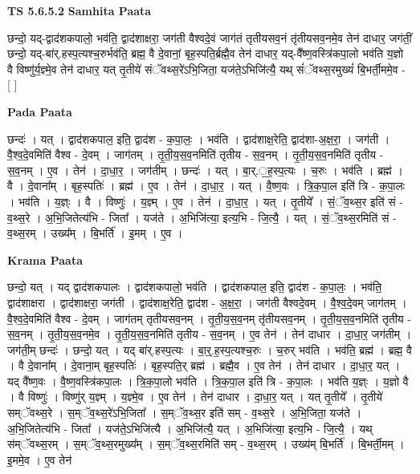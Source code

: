 \documentclass[17pt]{extarticle}
\begin{document}
\textbf{TS 5.6.5.2 } \newline
\textbf{Samhita Paata} \newline

छन्दो॒ यद्-द्वाद॑शकपालो॒ भव॑ति॒ द्वाद॑शाक्षरा॒ जग॑ती वैश्वदे॒वं जाग॑तं तृतीयसव॒नं तृ॑तीयसव॒नमे॒व तेन॑ दाधार॒ जग॑तीं॒ छन्दो॒ यद्-बा॑र्.हस्प॒त्यश्च॒रुर्भव॑ति॒ ब्रह्म॒ वै दे॒वानां॒ बृह॒स्पति॒र्ब्रह्मै॒व तेन॑ दाधार॒ यद्-वै᳚ष्ण॒वस्त्रि॑कपा॒लो भव॑ति य॒ज्ञो वै विष्णु॑र्य॒ज्ञ्मे॒व तेन॑ दाधार॒ यत् तृ॒तीये॑ संॅवथ्स॒रे॑ऽभि॒जिता॒ यज॑ते॒ऽभिजि॑त्यै॒ यथ् सं॑ॅवथ्स॒रमुख्यं॑ बि॒भर्ती॒ममे॒व - [  ] \newline

\textbf{Pada Paata} \newline

छन्दः॑ । यत् । द्वाद॑शकपाल॒ इति॒ द्वाद॑श - क॒पा॒लः॒ । भव॑ति । द्वाद॑शाक्ष॒रेति॒ द्वाद॑शा-अ॒क्ष॒रा॒ । जग॑ती । वै॒श्व॒दे॒वमिति॑ वैश्व - दे॒वम् । जाग॑तम् । तृ॒ती॒य॒स॒व॒नमिति॑ तृतीय - स॒व॒नम् । तृ॒ती॒य॒स॒व॒नमिति॑ तृतीय - स॒व॒नम् । ए॒व । तेन॑ । दा॒धा॒र॒ । जग॑तीम् । छन्दः॑ । यत् । बा॒र्.॒ह॒स्प॒त्यः । च॒रुः । भव॑ति । ब्रह्म॑ । वै । दे॒वाना᳚म् । बृह॒स्पतिः॑ । ब्रह्म॑ । ए॒व । तेन॑ । दा॒धा॒र॒ । यत् । वै॒ष्ण॒वः । त्रि॒क॒पा॒ल इति॑ त्रि - क॒पा॒लः । भव॑ति । य॒ज्ञ्ः । वै । विष्णुः॑ । य॒ज्ञ्म् । ए॒व । तेन॑ । दा॒धा॒र॒ । यत् । तृ॒तीये᳚ । सं॒ॅव॒थ्स॒र इति॑ सं - व॒थ्स॒रे । अ॒भि॒जितेत्य॑भि - जिता᳚ । यज॑ते । अ॒भिजि॑त्या॒ इत्य॒भि - जि॒त्यै॒ । यत् । सं॒ॅव॒थ्स॒रमिति॑ सं - व॒थ्स॒रम् । उख्य᳚म् । बि॒भर्ति॑ । इ॒मम् । ए॒व ।  \newline


\textbf{Krama Paata} \newline

छन्दो॒ यत् । यद् द्वाद॑शकपालः । द्वाद॑शकपालो॒ भव॑ति । द्वाद॑शकपाल॒ इति॒ द्वाद॑श - क॒पा॒लः॒ । भव॑ति॒ द्वाद॑शाक्षरा । द्वाद॑शाक्षरा॒ जग॑ती । द्वाद॑शाक्ष॒रेति॒ द्वाद॑श - अ॒क्ष॒रा॒ । जग॑ती वैश्वदे॒वम् । वै॒श्व॒दे॒वम् जाग॑तम् । वै॒श्व॒दे॒वमिति॑ वैश्व - दे॒वम् । जाग॑तम् तृतीयसव॒नम् । तृ॒ती॒य॒स॒व॒नम् तृ॑तीयसव॒नम् । तृ॒ती॒य॒स॒व॒नमिति॑ तृतीय - स॒व॒नम् । तृ॒ती॒य॒स॒व॒नमे॒व । तृ॒ती॒य॒स॒व॒नमिति॑ तृतीय - स॒व॒नम् । ए॒व तेन॑ । तेन॑ दाधार । दा॒धा॒र॒ जग॑तीम् । जग॑ती॒म् छन्दः॑ । छन्दो॒ यत् । यद् बा॑र्.हस्प॒त्यः । बा॒र्॒.ह॒स्प॒त्यश्च॒रुः । च॒रुर् भव॑ति । भव॑ति॒ ब्रह्म॑ । ब्रह्म॒ वै । वै दे॒वाना᳚म् । दे॒वाना॒म् बृह॒स्पतिः॑ । बृह॒स्पति॒र् ब्रह्म॑ । ब्रह्मै॒व । ए॒व तेन॑ । तेन॑ दाधार । दा॒धा॒र॒ यत् । यद् वै᳚ष्ण॒वः । वै॒ष्ण॒वस्त्रि॑कपा॒लः । त्रि॒क॒पा॒लो भव॑ति । त्रि॒क॒पा॒ल इति॑ त्रि - क॒पा॒लः । भव॑ति य॒ज्ञ्ः । य॒ज्ञो वै । वै विष्णुः॑ । विष्णु॑र् य॒ज्ञ्म् । य॒ज्ञ्मे॒व । ए॒व तेन॑ । तेन॑ दाधार । दा॒धा॒र॒ यत् । यत् तृ॒तीये᳚ । तृ॒तीये॑ सम्ॅवथ्स॒रे । स॒म्ॅव॒थ्स॒रे॑ऽभि॒जिता᳚ । स॒म्ॅव॒थ्स॒र इति॑ सम् - व॒थ्स॒रे । अ॒भि॒जिता॒ यज॑ते । अ॒भि॒जितेत्य॑भि - जिता᳚ । यज॑ते॒ऽभिजि॑त्यै । अ॒भिजि॑त्यै॒ यत् । अ॒भिजि॑त्या॒ इत्य॒भि - जि॒त्यै॒ । यथ् स॑म्ॅवथ्स॒रम् । स॒म्ॅव॒थ्स॒रमुख्य᳚म् । स॒म्ॅव॒थ्स॒रमिति॑ सम् - व॒थ्स॒रम् । उख्य॑म् बि॒भर्ति॑ । बि॒भर्ती॒मम् । इ॒ममे॒व । ए॒व तेन॑ \newline
\end{document}
